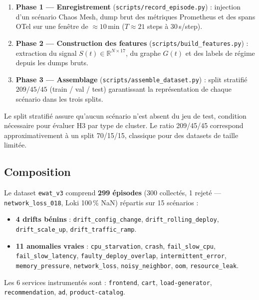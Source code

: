\begin{enumerate}
  \item \textbf{Phase 1 --- Enregistrement} (\texttt{scripts/record\_episode.py}) :
    injection d'un scénario Chaos Mesh, dump brut des métriques Prometheus
    et des spans OTel sur une fenêtre de $\approx 10$\,min
    ($T \approx 21$ steps à 30\,s/step).

  \item \textbf{Phase 2 --- Construction des features}
    (\texttt{scripts/build\_features.py}) :
    extraction du signal $S(t) \in \mathbb{R}^{N \times 17}$, du graphe $G(t)$
    et des labels de régime depuis les dumps bruts.

  \item \textbf{Phase 3 --- Assemblage} (\texttt{scripts/assemble\_dataset.py}) :
    split stratifié $209 / 45 / 45$ (train / val / test)
    garantissant la représentation de chaque scénario dans les trois splits.
\end{enumerate}

Le split stratifié assure qu'aucun scénario n'est absent du jeu de test, condition
nécessaire pour évaluer H3 par type de cluster. Le ratio 209/45/45 correspond
approximativement à un split 70/15/15, classique pour des datasets de taille limitée.

\subsection{Composition}
\label{sec:composition}

Le dataset \texttt{ewat\_v3} comprend \textbf{299 épisodes}
(300 collectés, 1 rejeté --- \texttt{network\_loss\_018}, Loki 100\,\% NaN)
répartis sur 15 scénarios :

\begin{itemize}
  \item \textbf{4 drifts bénins} :
    \texttt{drift\_config\_change}, \texttt{drift\_rolling\_deploy},
    \texttt{drift\_scale\_up}, \texttt{drift\_traffic\_ramp}.
  \item \textbf{11 anomalies vraies} :
    \texttt{cpu\_starvation}, \texttt{crash}, \texttt{fail\_slow\_cpu},
    \texttt{fail\_slow\_latency}, \texttt{faulty\_deploy\_overlap},
    \texttt{intermittent\_error}, \texttt{memory\_pressure},
    \texttt{network\_loss}, \texttt{noisy\_neighbor}, \texttt{oom},
    \texttt{resource\_leak}.
\end{itemize}

Les 6 services instrumentés sont :
\texttt{frontend}, \texttt{cart}, \texttt{load-generator},
\texttt{recommendation}, \texttt{ad}, \texttt{product-catalog}.

